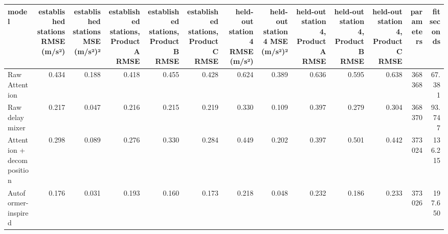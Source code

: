 \begin{tabular}{lrrrrrrrrrrrr}
\toprule
model & established stations RMSE (m/s²) & established stations MSE (m/s²)² & established stations, Product A RMSE & established stations, Product B RMSE & established stations, Product C RMSE & held-out station 4 RMSE (m/s²) & held-out station 4 MSE (m/s²)² & held-out station 4, Product A RMSE & held-out station 4, Product B RMSE & held-out station 4, Product C RMSE & parameters & fit seconds \\
\midrule
Raw Attention & 0.434 & 0.188 & 0.418 & 0.455 & 0.428 & 0.624 & 0.389 & 0.636 & 0.595 & 0.638 & 368368 & 67.381 \\
Raw delay mixer & 0.217 & 0.047 & 0.216 & 0.215 & 0.219 & 0.330 & 0.109 & 0.397 & 0.279 & 0.304 & 368370 & 93.747 \\
Attention + decomposition & 0.298 & 0.089 & 0.276 & 0.330 & 0.284 & 0.449 & 0.202 & 0.397 & 0.501 & 0.442 & 373024 & 136.215 \\
Autoformer-inspired & 0.176 & 0.031 & 0.193 & 0.160 & 0.173 & 0.218 & 0.048 & 0.232 & 0.186 & 0.233 & 373026 & 197.650 \\
\bottomrule
\end{tabular}
